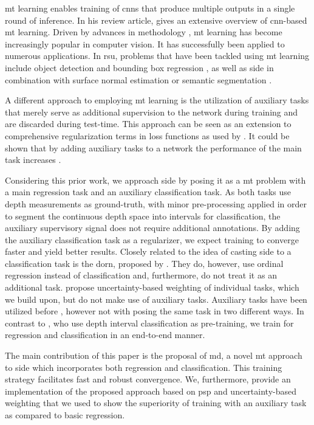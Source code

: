 \documentclass[lang=english]{tumarxivarticle}
\newcommand{\citep}{\parencite}
\newcommand{\citet}{\textcite}
\begin{document}
\Gls{mt} learning \citep{Caruana93,Caruana97} enables training of \glspl{cnn} that produce multiple outputs in a single round of inference.
In his review article, \citet{Ruder17} gives an extensive overview of \gls{cnn}-based \gls{mt} learning.
Driven by advances in methodology \citep{Sener18,Kendall18,Mallya18,Guo18,Zhao18}, \gls{mt} learning has become increasingly popular in computer vision.
It has successfully been applied to numerous applications.
In \gls{rsu}, problems that have been tackled using \gls{mt} learning include object detection and bounding box regression \citep{Teichmann18,Chen17,Chabot17}, as well as \gls{side} in combination with surface normal estimation or semantic segmentation \citep{Qi18,Zhang18,Eigen15,Ren18,Yang18,Kendall18}.

A different approach to employing \gls{mt} learning is the utilization of auxiliary tasks \citep{Liebel18,Chennupati19,Xu18} that merely serve as additional supervision to the network during training and are discarded during test-time.
This approach can be seen as an extension to comprehensive regularization terms in loss functions as used by \citet{Li18}.
It could be shown that by adding auxiliary tasks to a network the performance of the main task increases \citep{Liebel18,Chennupati19}.

Considering this prior work, we approach \gls{side} by posing it as a \gls{mt} problem with a main regression task and an auxiliary classification task.
As both tasks use depth measurements as ground-truth, with minor pre-processing applied in order to segment the continuous depth space into intervals for classification, the auxiliary supervisory signal does not require additional annotations.
By adding the auxiliary classification task as a regularizer, we expect training to converge faster and yield better results.
Closely related to the idea of casting \gls{side} to a classification task is the \gls{dorn}, proposed by \citet{Fu18}.
They do, however, use ordinal regression instead of classification and, furthermore, do not treat it as an additional task.
\citet{Kendall18} propose uncertainty-based weighting of individual tasks, which we build upon, but do not make use of auxiliary tasks.
Auxiliary tasks have been utilized before \citep{Liebel18,Chennupati19,Xu18}, however not with posing the same task in two different ways.
In contrast to \citet{Gurram18}, who use depth interval classification as pre-training, we train for regression and classification in an end-to-end manner.

The main contribution of this paper is the proposal of \gls{md}, a novel \gls{mt} approach to \gls{side} which incorporates both regression and classification.
This training strategy facilitates fast and robust convergence.
We, furthermore, provide an implementation of the proposed approach based on \gls{psp} \citep{Zhao17} and uncertainty-based weighting \citep{Kendall18} that we used to show the superiority of training with an auxiliary task as compared to basic regression.
\end{document}
